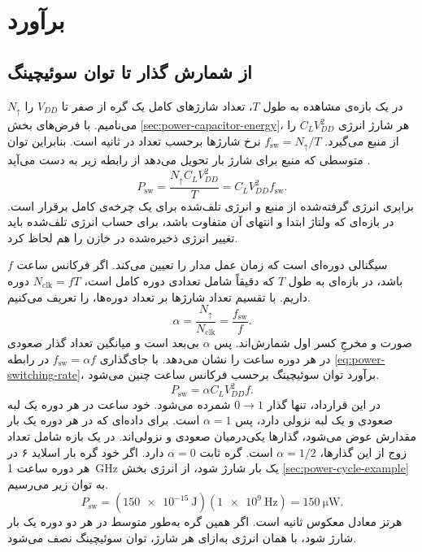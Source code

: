 \section{برآورد }
\label{sec:power-dynamic}

\subsection{از شمارش گذار تا توان سوئیچینگ}
\label{sec:power-switching}

در یک بازه‌ی مشاهده به طول \(T\)، تعداد شارژهای کامل یک گره از صفر
تا \(V_{DD}\) را \(N_{\uparrow}\) می‌نامیم. با فرض‌های بخش
\ref{sec:power-capacitor-energy}، هر شارژ انرژی \(C_LV_{DD}^2\) را
از منبع می‌گیرد. \(f_{\mathrm{sw}}=N_{\uparrow}/T\) نرخ شارژها
برحسب تعداد در ثانیه است. بنابراین توان متوسطی که منبع برای شارژ بار
تحویل می‌دهد از رابطه زیر به دست می‌آید
\cite[رابطه‌های  و ، صفحه ۱۸۴]{weste}
\cite[اسلایدهای ۷ و ۸]{powerslides}.
\begin{equation}
  P_{\mathrm{sw}}=\frac{N_{\uparrow}C_LV_{DD}^2}{T}
                =C_LV_{DD}^2 f_{\mathrm{sw}}.
  \label{eq:power-switching-rate}
\end{equation}
برابری انرژی گرفته‌شده از منبع و انرژی تلف‌شده برای یک چرخه‌ی کامل
برقرار است. در بازه‌ای که ولتاژ ابتدا و انتهای آن متفاوت باشد، برای
حساب انرژی تلف‌شده باید تغییر انرژی ذخیره‌شده در خازن را هم لحاظ کرد.

 سیگنالی دوره‌ای است که زمان عمل مدار را تعیین می‌کند.
اگر فرکانس ساعت \(f\) باشد، در بازه‌ای به طول \(T\) که دقیقاً شامل
تعدادی دوره کامل است، \(N_{\mathrm{clk}}=fT\) دوره داریم. با تقسیم
تعداد شارژها بر تعداد دوره‌ها،  را تعریف می‌کنیم.
\begin{equation}
  \alpha=\frac{N_{\uparrow}}{N_{\mathrm{clk}}}
        =\frac{f_{\mathrm{sw}}}{f}.
  \label{eq:power-activity-count}
\end{equation}
صورت و مخرجِ کسر اول شمارش‌اند. پس \(\alpha\) بی‌بعد است و میانگین
تعداد گذار صعودی در هر دوره ساعت را نشان می‌دهد. با جای‌گذاری
\(f_{\mathrm{sw}}=\alpha f\) در رابطه \eqref{eq:power-switching-rate}،
برآورد توان سوئیچینگ برحسب فرکانس ساعت چنین می‌شود.
\begin{equation}
  P_{\mathrm{sw}}=\alpha C_LV_{DD}^2 f.
  \label{eq:power-switching}
\end{equation}
در این قرارداد، تنها گذار \(0\to 1\) شمرده می‌شود. خود ساعت در هر
دوره یک لبه صعودی و یک لبه نزولی دارد، پس \(\alpha=1\) است. برای
داده‌ای که در هر دوره یک بار مقدارش عوض می‌شود، گذارها یکی‌درمیان
صعودی و نزولی‌اند. در یک بازه شامل تعداد زوج از این گذارها،
\(\alpha=1/2\) است. گره ثابت \(\alpha=0\) دارد. اگر خود گره بار
اسلاید ۶ در هر دوره ساعت \qty{1}{\giga\hertz} یک بار شارژ شود،
از انرژی بخش \ref{sec:power-cycle-example} به توان زیر می‌رسیم.
\[
  P_{\mathrm{sw}}=(\qty{150e-15}{\joule})(\qty{1e9}{\hertz})
                =\qty{150}{\micro\watt}.
\]
هرتز معادل معکوس ثانیه است. اگر همین گره به‌طور متوسط در هر دو دوره
یک بار شارژ شود، با همان انرژی به‌ازای هر شارژ، توان سوئیچینگ نصف
می‌شود.

